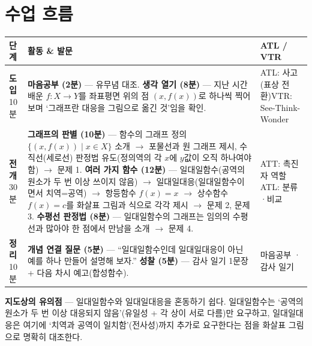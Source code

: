 \documentclass[11pt,a4paper]{article}
\begin{document}
\section{수업 흐름}
\begin{tabularx}{\linewidth}{@{}>{\centering\arraybackslash}p{1.6cm}X>{\raggedright\arraybackslash\small}p{3.1cm}@{}}
\toprule
\textbf{단계} & \textbf{활동 \& 발문} & \textbf{ATL / VTR} \\
\midrule
\textcolor{goldstrong}{\textbf{도입}}\newline\footnotesize 10분 &
\textbf{마음공부 (2분)} --- 유무념 대조.\newline
\textbf{생각 열기 (8분)} --- 지난 시간 배운 $f:X\to Y$를 좌표평면 위의 점 $(x,f(x))$로 하나씩 찍어보며 `그래프란 대응을 그림으로 옮긴 것'임을 확인. &
ATL: 사고(표상 전환)\newline VTR: See-Think-Wonder \\
\addlinespace
\textcolor{goldstrong}{\textbf{전개}}\newline\footnotesize 30분 &
\textbf{그래프의 판별 (10분)} --- 함수의 그래프 정의 $\{(x,f(x))\mid x\in X\}$ 소개 $\to$ 포물선과 원 그래프 제시, 수직선(세로선) 판정법 유도(정의역의 각 $x$에 $y$값이 오직 하나여야 함) $\to$ 문제 1.\newline
\textbf{여러 가지 함수 (12분)} --- 일대일함수(공역의 원소가 두 번 이상 쓰이지 않음) $\to$ 일대일대응(일대일함수이면서 치역=공역) $\to$ 항등함수 $f(x)=x$ $\to$ 상수함수 $f(x)=c$를 화살표 그림과 식으로 각각 제시 $\to$ 문제 2, 문제 3.\newline
\textbf{수평선 판정법 (8분)} --- 일대일함수의 그래프는 임의의 수평선과 많아야 한 점에서 만남을 소개 $\to$ 문제 4. &
ATT: 촉진자 역할\newline ATL: 분류·비교 \\
\addlinespace
\textcolor{goldstrong}{\textbf{정리}}\newline\footnotesize 10분 &
\textbf{개념 연결 질문 (5분)} --- ``일대일함수인데 일대일대응이 아닌 예를 하나 만들어 설명해 보자.''\newline
\textbf{성찰 (5분)} --- 감사 일기 1문장 + 다음 차시 예고(합성함수). &
마음공부 · 감사 일기 \\
\bottomrule
\end{tabularx}

\begin{calloutbox}
\textbf{지도상의 유의점} --- 일대일함수와 일대일대응을 혼동하기 쉽다. 일대일함수는 `공역의 원소가 두 번 이상 대응되지 않음'(유일성 + 각 상이 서로 다름)만 요구하고, 일대일대응은 여기에 `치역과 공역이 일치함'(전사성)까지 추가로 요구한다는 점을 화살표 그림으로 명확히 대조한다.
\end{calloutbox}
\end{document}
